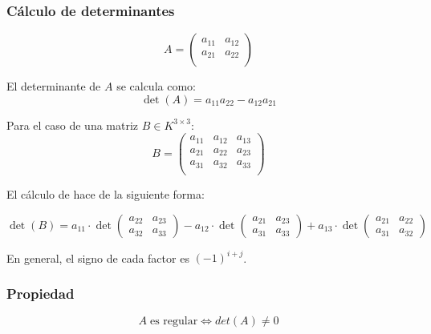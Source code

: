 \subsubsection*{Cálculo de determinantes}
\[
A = \begin{pmatrix}
    a_{11} & a_{12} \\
    a_{21} & a_{22} \\
\end{pmatrix}
\]

El determinante de \(A\) se calcula como:
\[
\det(A) = a_{11} a_{22} - a_{12} a_{21}
\]

Para el caso de una matriz \(B \in K^{3 \times 3}\):
\[
B = \begin{pmatrix}
    a_{11} & a_{12} & a_{13} \\
    a_{21} & a_{22} & a_{23} \\
    a_{31} & a_{32} & a_{33} \\
\end{pmatrix}
\]

El cálculo de hace de la siguiente forma:

\[
\det(B) = a_{11} \cdot \det\begin{pmatrix} a_{22} & a_{23} \\ a_{32} & a_{33} \end{pmatrix} - a_{12} \cdot \det\begin{pmatrix} a_{21} & a_{23} \\ a_{31} & a_{33} \end{pmatrix} + a_{13} \cdot \det\begin{pmatrix} a_{21} & a_{22} \\ a_{31} & a_{32} \end{pmatrix}
\]

En general, el signo de cada factor es \((-1)^{i+j}\).
\subsubsection*{Propiedad}
\[A \; \text{es regular} \iff det(A) \neq 0\]

